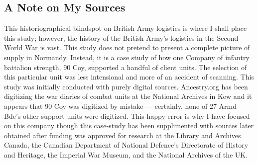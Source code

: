 \documentclass[noraggedright]{turabian-researchpaper}
\begin{document}

		

	\subsection{A Note on My Sources}
This historiographical blindspot on British Army logistics is where I shall 
place this study; however, the history of the British Army's logistics in the 
Second World War is vast.  This study does not pretend to present a complete 
picture of supply in Normandy.  Instead, it is a case study of how one Company
of infantry battalion strength, 90 Coy, supported a handful of client units.  
The selection of this particular unit was less intensional and more of an 
accident of scanning.  This study was initially conducted with purely digital 
sources.  Ancestry.org has been digitizing the war diaries of combat units at 
the National Archives in Kew and it appears that 90 Coy was digitized by 
mistake --- certainly, none of 27 Armd Bde's other support units were 
digitized.  This happy error is why I have focused on this company though 
this case-study has been supplimented with sources later obtained after 
funding was approved for research at the Library and Archives Canada, the 
Canadian Department of National Defence's Directorate of History and Heritage,
the Imperial War Museum, and the National Archives of the UK.
\end{document}
